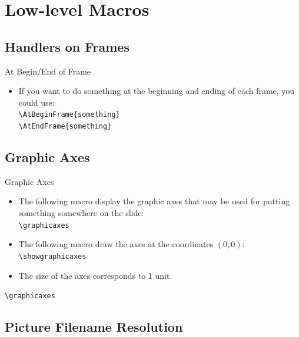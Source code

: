 \documentclass[english,sectioncirclenumberstyle]{le2iutbmbeamer}
\begin{document}
\section{Low-level Macros}
\tableofcontentslide[sectionstyle={show/shaded},subsectionstyle={show/show/hide},subsubsectionstyle={hide/hide/hide/hide},sections={3-}]

\subsection{Handlers on Frames}

\begin{frame}{At Begin/End of Frame}
	\begin{itemize}
	\item If you want to do something at the beginning and ending of each frame, you could use: \\
		\texttt{{\textbackslash}AtBeginFrame\{something\}} \\
		\texttt{{\textbackslash}AtEndFrame\{something\}}
	\end{itemize}
\end{frame}

\subsection{Graphic Axes}

\begin{frame}{Graphic Axes}
	\begin{itemize}
	\item The following macro display the graphic axes that may be used for putting something somewhere on the slide: \\
		\texttt{{\textbackslash}graphicaxes}
	\item The following macro draw the axes at the coordinates $(0,0)$: \\
		\texttt{{\textbackslash}showgraphicaxes}
	\item The size of the axes corresponds to 1 unit.
	\end{itemize}
	\begin{example}
		\texttt{{\textbackslash}graphicaxes}\\
		\graphicaxes
	\end{example}
\end{frame}

\subsection{Picture Filename Resolution}
\end{document}
